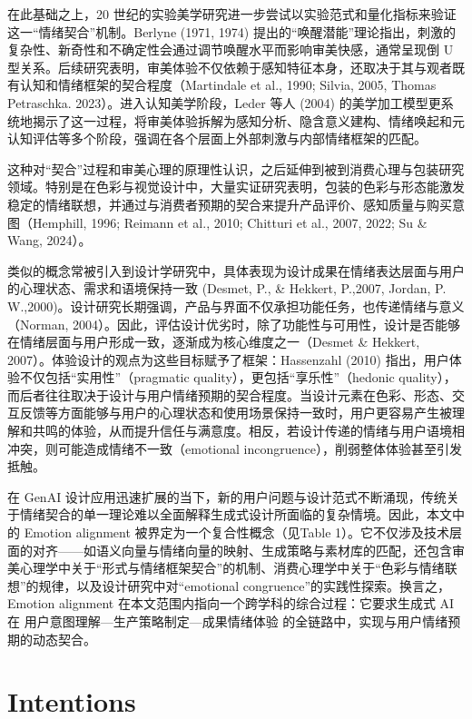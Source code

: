 在此基础之上，20 世纪的实验美学研究进一步尝试以实验范式和量化指标来验证这一“情绪契合”机制。Berlyne (1971, 1974) 提出的“唤醒潜能”理论指出，刺激的复杂性、新奇性和不确定性会通过调节唤醒水平而影响审美快感，通常呈现倒 U 型关系。后续研究表明，审美体验不仅依赖于感知特征本身，还取决于其与观者既有认知和情绪框架的契合程度（Martindale et al., 1990; Silvia, 2005, Thomas Petraschka. 2023）。进入认知美学阶段，Leder 等人 (2004) 的美学加工模型更系统地揭示了这一过程，将审美体验拆解为感知分析、隐含意义建构、情绪唤起和元认知评估等多个阶段，强调在各个层面上外部刺激与内部情绪框架的匹配。

这种对“契合”过程和审美心理的原理性认识，之后延伸到被到消费心理与包装研究领域。特别是在色彩与视觉设计中，大量实证研究表明，包装的色彩与形态能激发稳定的情绪联想，并通过与消费者预期的契合来提升产品评价、感知质量与购买意图（Hemphill, 1996; Reimann et al., 2010; Chitturi et al., 2007, 2022; Su \& Wang, 2024）。

类似的概念常被引入到设计学研究中，具体表现为设计成果在情绪表达层面与用户的心理状态、需求和语境保持一致 (Desmet, P., \& Hekkert, P.,2007, Jordan, P. W.,2000)。设计研究长期强调，产品与界面不仅承担功能任务，也传递情绪与意义（Norman, 2004）。因此，评估设计优劣时，除了功能性与可用性，设计是否能够在情绪层面与用户形成一致，逐渐成为核心维度之一（Desmet \& Hekkert, 2007）。体验设计的观点为这些目标赋予了框架：Hassenzahl (2010) 指出，用户体验不仅包括“实用性”（pragmatic quality），更包括“享乐性”（hedonic quality），而后者往往取决于设计与用户情绪预期的契合程度。当设计元素在色彩、形态、交互反馈等方面能够与用户的心理状态和使用场景保持一致时，用户更容易产生被理解和共鸣的体验，从而提升信任与满意度。相反，若设计传递的情绪与用户语境相冲突，则可能造成情绪不一致（emotional incongruence），削弱整体体验甚至引发抵触。

在 GenAI 设计应用迅速扩展的当下，新的用户问题与设计范式不断涌现，传统关于情绪契合的单一理论难以全面解释生成式设计所面临的复杂情境。因此，本文中的 Emotion alignment 被界定为一个复合性概念（见Table 1）。它不仅涉及技术层面的对齐——如语义向量与情绪向量的映射、生成策略与素材库的匹配，还包含审美心理学中关于“形式与情绪框架契合”的机制、消费心理学中关于“色彩与情绪联想”的规律，以及设计研究中对“emotional congruence”的实践性探索。换言之，Emotion alignment 在本文范围内指向一个跨学科的综合过程：它要求生成式 AI 在 用户意图理解—生产策略制定—成果情绪体验 的全链路中，实现与用户情绪预期的动态契合。


\section{Intentions}

